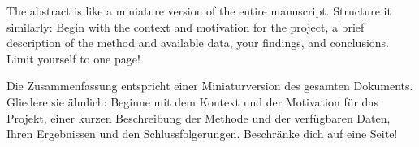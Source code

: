 
\begin{managementsummary}
\addchaptertocentry{\managementsummaryname} %
The abstract is like a miniature version of the entire manuscript. Structure it similarly: Begin with the context and motivation for the project, a brief description of the method and available data, your findings, and conclusions. Limit yourself to one page!
\end{managementsummary}


\begin{extraManagementsummary}
\addchaptertocentry{\extramanagementsummaryname} %

Die Zusammenfassung entspricht einer Miniaturversion des gesamten Dokuments. Gliedere sie ähnlich: Beginne mit dem Kontext und der Motivation für das Projekt, einer kurzen Beschreibung der Methode und der verfügbaren Daten, Ihren Ergebnissen und den Schlussfolgerungen. Beschränke dich auf eine Seite!    
\end{extraManagementsummary}